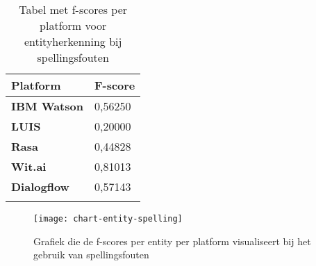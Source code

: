 \begin{center}
    \begin{longtable}{| l | l |}
        \hline
        \textbf{Platform} & \textbf{F-score} \\ \hline
        \textbf{IBM Watson} & 0,56250 \\ \hline  
        \textbf{LUIS} & 0,20000 \\ \hline  
        \textbf{Rasa} & 0,44828 \\ \hline  
        \textbf{Wit.ai} & 0,81013  \\ \hline  
        \textbf{Dialogflow} & 0,57143 \\ \hline  
        \caption{Tabel met f-scores per platform voor entityherkenning bij spellingsfouten}                                    
    \end{longtable}
    \label{tbl:results-entity-spelling}
\end{center}

\begin{figure}[H]
    \label{fig:chart-entity-spelling}
    \centering
    \texttt{[image: chart-entity-spelling]}
    \caption{Grafiek die de f-scores per entity per platform visualiseert bij het gebruik van spellingsfouten}
\end{figure}














